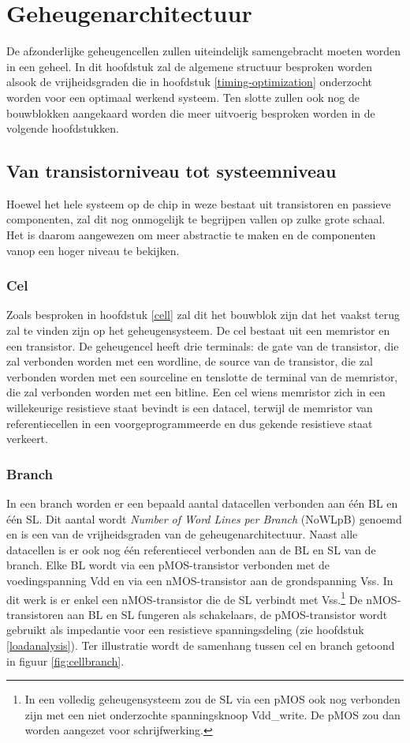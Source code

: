 \chapter{Geheugenarchitectuur}
\label{architecture}
De afzonderlijke geheugencellen zullen uiteindelijk samengebracht moeten worden in een geheel.
In dit hoofdstuk zal de algemene structuur besproken worden alsook de vrijheidsgraden die in hoofdstuk \ref{timing-optimization} onderzocht worden voor een optimaal werkend systeem. Ten slotte zullen ook nog de bouwblokken aangekaard worden die meer uitvoerig besproken worden in de volgende hoofdstukken. 

\section{Van transistorniveau tot systeemniveau}
Hoewel het hele systeem op de chip in weze bestaat uit transistoren en passieve componenten, zal dit nog onmogelijk te begrijpen vallen op zulke grote schaal.
Het is daarom aangewezen om meer abstractie te maken en de componenten vanop een hoger niveau te bekijken.

\subsection{Cel}
Zoals besproken in hoofdstuk \ref{cell} zal dit het bouwblok zijn dat het vaakst terug zal te vinden zijn op het geheugensysteem.
De cel bestaat uit een memristor en een transistor. De geheugencel heeft drie terminals: de gate van de transistor, die zal verbonden worden met een wordline, de source van de transistor, die zal verbonden worden met een sourceline en tenslotte de terminal van de memristor, die zal verbonden worden met een bitline.
Een cel wiens memristor zich in een willekeurige resistieve staat bevindt is een datacel, terwijl de memristor van referentiecellen in een voorgeprogrammeerde en dus gekende resistieve staat verkeert.

\subsection{Branch}
In een branch worden er een bepaald aantal datacellen verbonden aan één BL en één SL. Dit aantal wordt \emph{Number of Word Lines per Branch} (NoWLpB) genoemd en is een van de vrijheidsgraden van de geheugenarchitectuur. Naast alle datacellen is er ook nog één referentiecel verbonden aan de BL en SL van de branch.
Elke BL wordt via een pMOS-transistor verbonden met de voedingspanning Vdd en via een nMOS-transistor aan de grondspanning Vss. In dit werk is er enkel een nMOS-transistor die de SL verbindt met Vss.\footnote{In een volledig geheugensysteem zou de SL via een pMOS ook nog verbonden zijn met een niet onderzochte spanningsknoop Vdd\_write. De pMOS zou dan worden aangezet voor schrijfwerking.} De nMOS-transistoren aan BL en SL fungeren als schakelaars, de pMOS-transistor wordt gebruikt als impedantie voor een resistieve spanningsdeling (zie hoofdstuk \ref{loadanalysis}).
Ter illustratie wordt de samenhang tussen cel en branch getoond in figuur \ref{fig:cellbranch}.

